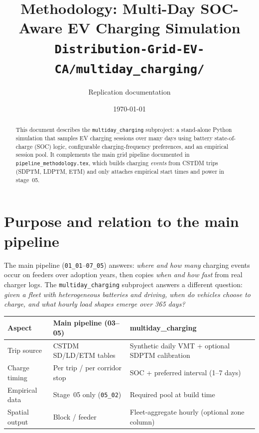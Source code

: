 \documentclass[11pt,a4paper]{article}
\title{Methodology: Multi-Day SOC-Aware EV Charging Simulation\\
\small \texttt{Distribution-Grid-EV-CA/multiday\_charging/}}
\author{Replication documentation}
\date{\today}
\begin{document}
\maketitle

\begin{abstract}
This document describes the \texttt{multiday\_charging} subproject: a stand-alone Python simulation that samples EV charging sessions over many days using battery state-of-charge (SOC) logic, configurable charging-frequency preferences, and an empirical session pool. It complements the main grid pipeline documented in \texttt{pipeline\_methodology.tex}, which builds charging \emph{events} from CSTDM trips (SDPTM, LDPTM, ETM) and only attaches empirical start times and power in stage~05.
\end{abstract}

\tableofcontents
\newpage

\section{Purpose and relation to the main pipeline}

The main pipeline (\texttt{01\_01}--\texttt{07\_05}) answers: \emph{where and how many} charging events occur on feeders over adoption years, then copies \emph{when and how fast} from real charger logs. The \texttt{multiday\_charging} subproject answers a different question: \emph{given a fleet with heterogeneous batteries and driving, when do vehicles choose to charge, and what hourly load shapes emerge over 365 days?}

\begin{center}
\begin{tabular}{lll}
\toprule
\textbf{Aspect} & \textbf{Main pipeline (03--05)} & \textbf{multiday\_charging} \\
\midrule
Trip source & CSTDM SD/LD/ETM tables & Synthetic daily VMT + optional SDPTM calibration \\
Charge timing & Per trip / per corridor stop & SOC + preferred interval (1--7 days) \\
Empirical data & Stage~05 only (\texttt{05\_02}) & Required pool at build time \\
Spatial output & Block / feeder & Fleet-aggregate hourly (optional zone column) \\
\bottomrule
\end{tabular}
\end{center}
\end{document}
